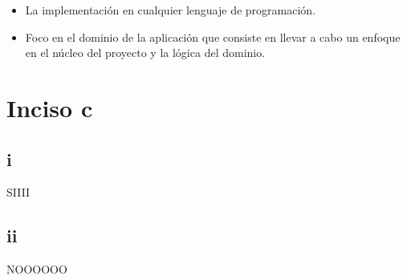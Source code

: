 \documentclass[10pt]{amsart}
\begin{document}
	\begin{itemize}			
		\item La implementación en cualquier lenguaje de programación.
		\item Foco en el dominio de la aplicación que consiste en llevar a cabo un enfoque en el núcleo del proyecto y la lógica del dominio.
	\end{itemize}
	
	
	\section*{Inciso c}
	\subsection*{i}
        SIIII
 
	\subsection*{ii}
	NOOOOOO
 
	
\end{document}
